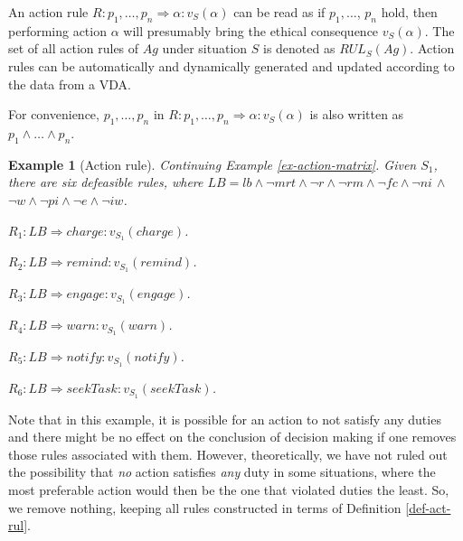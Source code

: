 \documentclass[letterpaper]{article} %
\newtheorem{example}{Example}
\begin{document}
An action rule $R: p_1, \dots, p_n \Rightarrow \alpha: v_S(\alpha)$ can be read as if $p_1, \dots$, $p_n$ hold, then performing action $\alpha$ will presumably bring the ethical consequence $v_S(\alpha)$. The set of all action rules of $Ag$ under situation $S$ is denoted as $RUL_S(Ag)$. Action rules can be automatically and dynamically generated and updated according to the data from a VDA. 


For convenience, $p_1, \dots, p_n$ in $R: p_1, \dots, p_n \Rightarrow \alpha: v_S(\alpha)$ is also written as $p_1 \wedge \dots \wedge p_n$.

\begin{example}[Action rule] \label{ex-1}
Continuing Example \ref{ex-action-matrix}. Given 
$S_1$, there are six defeasible rules, where $LB = lb \wedge \neg mrt \wedge \neg r \wedge \neg rm \wedge \neg fc \wedge \neg ni$ $\wedge$ $\neg w \wedge \neg pi \wedge \neg e \wedge \neg iw$.
\begin{description}
\item $R_1: LB \Rightarrow  charge: v_{S_1}(charge)$. 
\item $R_2: LB \Rightarrow  remind: v_{S_1}(remind)$.
\item $R_3: LB \Rightarrow  engage: v_{S_1}(engage)$. 
\item $R_4: LB \Rightarrow  warn: v_{S_1}(warn)$.
\item $R_5: LB \Rightarrow  notify: v_{S_1}(notify)$. 
\item $R_6: LB \Rightarrow  seekTask: v_{S_1}(seekTask)$.
 \end{description}
\end{example}

Note that in this example, it is possible for an action to not satisfy any duties and there might be no effect on the conclusion of decision making if one removes those rules associated with them. However, theoretically, we have not ruled out the possibility that \textit{no} action satisfies \textit{any} duty in some situations, where the most preferable action would then be the one that violated duties the least. So, we remove nothing, keeping all rules constructed in terms of Definition \ref{def-act-rul}. 
\end{document}
